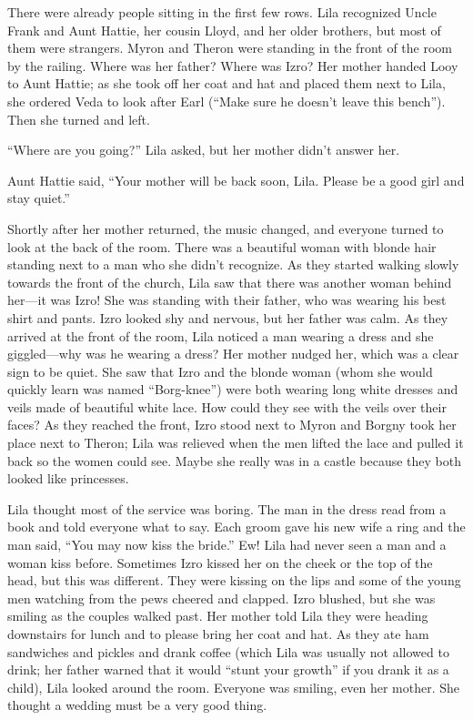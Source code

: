 \documentclass[
  american,
  letterpaper,
]{book}
\begin{document}
There were already people sitting in the first few rows. Lila recognized
Uncle Frank and Aunt Hattie, her cousin Lloyd, and her older brothers,
but most of them were strangers. Myron and Theron were standing in the
front of the room by the railing. Where was her father? Where was Izro?
Her mother handed Looy to Aunt Hattie; as she took off her coat and hat
and placed them next to Lila, she ordered Veda to look after Earl
(``Make sure he doesn't leave this bench''). Then she turned and left.

``Where are you going?'' Lila asked, but her mother didn't answer her.

Aunt Hattie said, ``Your mother will be back soon, Lila. Please be a
good girl and stay quiet.''

Shortly after her mother returned, the music changed, and everyone
turned to look at the back of the room. There was a beautiful woman with
blonde hair standing next to a man who she didn't recognize. As they
started walking slowly towards the front of the church, Lila saw that
there was another woman behind her---it was Izro! She was standing with
their father, who was wearing his best shirt and pants. Izro looked shy
and nervous, but her father was calm. As they arrived at the front of
the room, Lila noticed a man wearing a dress and she giggled---why was
he wearing a dress? Her mother nudged her, which was a clear sign to be
quiet. She saw that Izro and the blonde woman (whom she would quickly
learn was named ``Borg-knee'') were both wearing long white dresses and
veils made of beautiful white lace. How could they see with the veils
over their faces? As they reached the front, Izro stood next to Myron
and Borgny took her place next to Theron; Lila was relieved when the men
lifted the lace and pulled it back so the women could see. Maybe she
really was in a castle because they both looked like princesses.

Lila thought most of the service was boring. The man in the dress read
from a book and told everyone what to say. Each groom gave his new wife
a ring and the man said, ``You may now kiss the bride.'' Ew! Lila had
never seen a man and a woman kiss before. Sometimes Izro kissed her on
the cheek or the top of the head, but this was different. They were
kissing on the lips and some of the young men watching from the pews
cheered and clapped. Izro blushed, but she was smiling as the couples
walked past. Her mother told Lila they were heading downstairs for lunch
and to please bring her coat and hat. As they ate ham sandwiches and
pickles and drank coffee (which Lila was usually not allowed to drink;
her father warned that it would ``stunt your growth'' if you drank it as
a child), Lila looked around the room. Everyone was smiling, even her
mother. She thought a wedding must be a very good thing.
\end{document}
